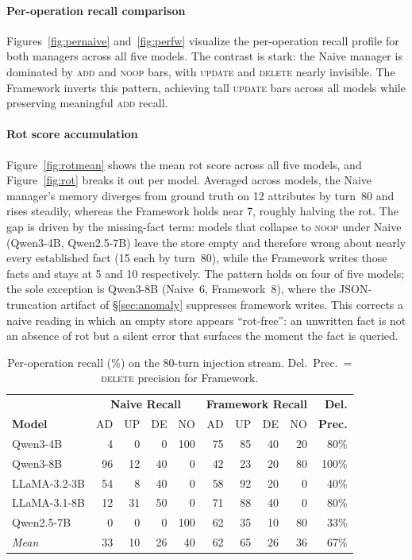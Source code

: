 \documentclass[10pt, twocolumn]{article}
\begin{document}
\paragraph{Per-operation recall comparison}
Figures~\ref{fig:pernaive} and~\ref{fig:perfw} visualize the per-operation
recall profile for both managers across all five models.
The contrast is stark: the Naive manager is dominated by \textsc{add} and
\textsc{noop} bars, with \textsc{update} and \textsc{delete} nearly
invisible. The Framework inverts this pattern, achieving tall
\textsc{update} bars across all models while preserving meaningful
\textsc{add} recall.

\paragraph{Rot score accumulation}
Figure~\ref{fig:rotmean} shows the mean rot score across all five models,
and Figure~\ref{fig:rot} breaks it out per model.
Averaged across models, the Naive manager's memory diverges from ground
truth on 12 attributes by turn~80 and rises steadily, whereas the
Framework holds near 7, roughly halving the rot.
The gap is driven by the missing-fact term: models that collapse to
\textsc{noop} under Naive (Qwen3-4B, Qwen2.5-7B) leave the store empty and
therefore wrong about nearly every established fact (15 each by turn~80),
while the Framework writes those facts and stays at 5 and 10 respectively.
The pattern holds on four of five models; the sole exception is Qwen3-8B
(Naive~6, Framework~8), where the JSON-truncation artifact of
\S\ref{sec:anomaly} suppresses framework writes.
This corrects a naive reading in which an empty store appears
``rot-free'': an unwritten fact is not an absence of rot but a silent
error that surfaces the moment the fact is queried.

\begin{table}[t]
\centering
\caption{Per-operation recall (\%) on the 80-turn injection stream.
  Del.\ Prec.\ = \textsc{delete} precision for Framework.}
\label{tab:ops}
\setlength{\tabcolsep}{3pt}
\scriptsize
\begin{tabular}{lrrrr@{\hspace{6pt}}rrrr@{\hspace{6pt}}r}
\toprule
 & \multicolumn{4}{c}{\textbf{Naive Recall}} & \multicolumn{4}{c}{\textbf{Framework Recall}} & \textbf{Del.}\\
\textbf{Model} & AD & UP & DE & NO & AD & UP & DE & NO & \textbf{Prec.} \\
\midrule
Qwen3-4B     & 4  & 0  & 0  & 100 & 75  & 85 & 40 & 20  & 80\% \\
Qwen3-8B     & 96 & 12 & 40 & 0   & 42  & 23 & 20 & 80  & 100\% \\
LLaMA-3.2-3B & 54 & 8  & 40 & 0   & 58  & 92 & 20 & 0   & 40\% \\
LLaMA-3.1-8B & 12 & 31 & 50 & 0   & 71  & 88 & 40 & 0   & 80\% \\
Qwen2.5-7B   & 0  & 0  & 0  & 100 & 62  & 35 & 10 & 80  & 33\% \\
\midrule
\textit{Mean} & 33 & 10 & 26 & 40  & 62  & 65 & 26 & 36  & 67\% \\
\bottomrule
\end{tabular}
\end{table}
\end{document}
